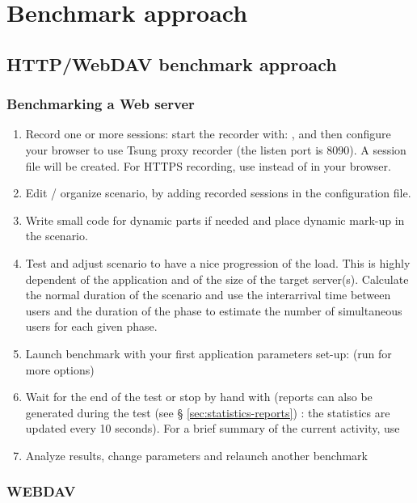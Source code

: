 \documentclass{TSUNG-en}
\begin{document}
\section{Benchmark approach}

\subsection{HTTP/WebDAV benchmark approach}

\subsubsection{Benchmarking a Web server}

\begin{enumerate}
\item Record one or more sessions: start the recorder with:
  , and then configure your browser to use Tsung
  proxy recorder (the listen port is 8090). A session file will be
  created. For HTTPS recording, use  instead of
     in your browser.
\item Edit / organize scenario, by adding recorded sessions in the
  configuration file.
\item Write small code for dynamic parts if needed and place dynamic mark-up
in the scenario.
\item Test and adjust scenario to have a nice progression of the load. This
is highly dependent of the application and of the size of the target
server(s). Calculate the normal duration of the scenario and use the
interarrival time between users and the duration of the phase to estimate
the number of simultaneous users for each given phase.
\item Launch benchmark with your first application parameters set-up:
   (run  for more options)
\item Wait for the end of the test or stop by hand with
   (reports can also be generated during the
  test (see § \ref{sec:statistics-reports}) : the statistics are
  updated every 10 seconds). For a brief summary of the current
  activity, use 
\item Analyze results, change parameters and relaunch another benchmark
\end{enumerate}

\subsubsection{WEBDAV }
\end{document}
